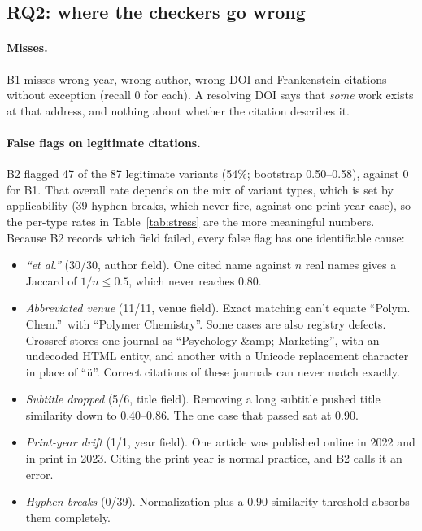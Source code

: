 \documentclass[acmsmall,screen,nonacm]{acmart}
\newcommand{\BOne}{B1}
\newcommand{\BTwo}{B2}
\begin{document}
\subsection{RQ2: where the checkers go wrong}
\paragraph{Misses.} \BOne{} misses wrong-year, wrong-author, wrong-DOI and Frankenstein citations without exception (recall 0 for each). A resolving DOI says that \emph{some} work exists at that address, and nothing about whether the citation describes it.

\paragraph{False flags on legitimate citations.} \BTwo{} flagged 47 of the 87 legitimate variants (54\%; bootstrap 0.50--0.58), against 0 for \BOne{}. That overall rate depends on the mix of variant types, which is set by applicability (39 hyphen breaks, which never fire, against one print-year case), so the per-type rates in Table~\ref{tab:stress} are the more meaningful numbers. Because \BTwo{} records which field failed, every false flag has one identifiable cause:
\begin{itemize}[leftmargin=1.2em,itemsep=1pt]
\item \emph{``et al.''} (30/30, author field). One cited name against $n$ real names gives a Jaccard of $1/n \leq 0.5$, which never reaches 0.80.
\item \emph{Abbreviated venue} (11/11, venue field). Exact matching can't equate ``Polym. Chem.''\ with ``Polymer Chemistry''. Some cases are also registry defects. Crossref stores one journal as ``Psychology \&amp; Marketing'', with an undecoded HTML entity, and another with a Unicode replacement character in place of ``ü''. Correct citations of these journals can never match exactly.
\item \emph{Subtitle dropped} (5/6, title field). Removing a long subtitle pushed title similarity down to 0.40--0.86. The one case that passed sat at 0.90.
\item \emph{Print-year drift} (1/1, year field). One article was published online in 2022 and in print in 2023. Citing the print year is normal practice, and \BTwo{} calls it an error.
\item \emph{Hyphen breaks} (0/39). Normalization plus a 0.90 similarity threshold absorbs them completely.
\end{itemize}
\end{document}
